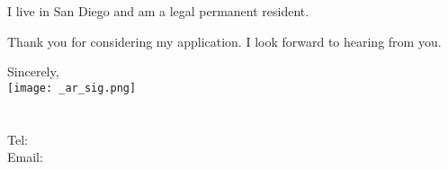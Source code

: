 \documentclass[letterpaper]{article}
\newcommand{\impt}[1]{\uline{#1}}
\begin{document}


I live in San Diego and am a legal permanent resident.  

Thank you for considering my application.
I look forward to hearing from you.  


Sincerely,\\
    \hspace{1em} 
    \texttt{[image: \_ar\_sig.png]} \\
\CVname \\
\small
\CVaddresswrap \\
Tel: \CVphone \\
Email: \CVemail
\end{document}
